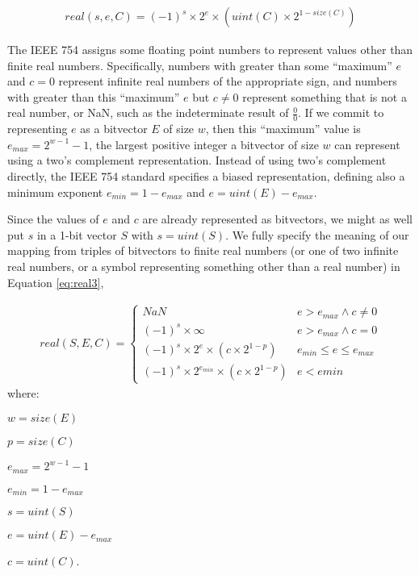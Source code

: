 \documentclass[letterpaper,10pt]{article}
\begin{document}
\begin{align} \label{eq:real2}
 real(s, e, C) = (-1)^s \times 2^e \times (uint(C) \times 2^{1 - size(C)})
\end{align}

The IEEE 754 assigns some floating point numbers to represent values other than finite real numbers. Specifically, numbers with greater than some ``maximum'' $e$ and $c = 0$ represent infinite real numbers of the appropriate sign, and numbers with greater than this ``maximum'' $e$ but $c \neq 0$ represent something that is not a real number, or NaN, such as the indeterminate result of $\frac{0}{0}$. If we commit to representing $e$ as a bitvector $E$ of size $w$, then this ``maximum'' value is $e_{max} = 2^{w-1} - 1$, the largest positive integer a bitvector of size $w$ can represent using a two's complement representation. Instead of using two's complement directly, the IEEE 754 standard specifies a biased representation, defining also a minimum exponent $e_{min} = 1 - e_{max}$ and $e = uint(E) - e_{max}$.

Since the values of $e$ and $c$ are already represented as bitvectors, we might as well put $s$ in a 1-bit vector $S$ with $s = uint(S)$. We fully specify the meaning of our mapping from triples of bitvectors to finite real numbers (or one of two infinite real numbers, or a symbol representing something other than a real number) in Equation \ref{eq:real3},

\begin{align} \label{eq:real3}
 real(S, E, C) =
 \begin{cases}
  NaN                                                   & e > e_{max} \land c \neq 0  \\
  (-1)^s \times \infty                                  & e > e_{max} \land c = 0     \\
  (-1)^s \times 2^e \times (c \times 2^{1 - p})         & e_{min} \leq e \leq e_{max} \\
  (-1)^s \times 2^{e_{min}} \times (c \times 2^{1 - p}) & e < emin
 \end{cases}
\end{align}
where:
\begin{description}
 \item $w = size(E)$
 \item $p = size(C)$
 \item $e_{max} = 2^{w-1} - 1$
 \item $e_{min} = 1 - e_{max}$
 \item $s = uint(S)$
 \item $e = uint(E) - e_{max}$
 \item $c = uint(C)$.
\end{description}
\end{document}
